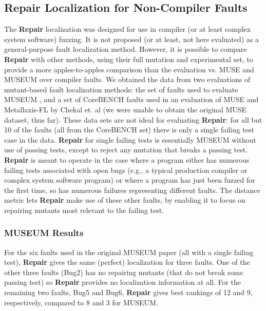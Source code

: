 \subsection{Repair Localization for Non-Compiler Faults}
\label{sec:otherfaults}

The {\bf Repair} localization was designed for use in compiler (or at least complex system software) fuzzing.  It is not proposed (or at least, not here evaluated) as a general-purpose fault localization method.  However, it is possible to compare {\bf Repair} with other methods, using their full mutation and experimental set, to provide a more apples-to-apples comparison than the evaluation vs. MUSE and MUSEUM over compiler faults.  We obtained the data from two evaluations of mutant-based fault localization methods:  the set of faults used to evaluate MUSEUM \cite{multilingual}, and a set of CoreBENCH \cite{CoreBENCH} faults used in an evaluation of MUSE and Metallaxis-FL by Chekal et. al \cite{Papadakis} (we were unable to obtain the original MUSE dataset, thus far).  These data sets are not ideal for evaluating {\bf Repair}: for all but 10 of the faults (all from the CoreBENCH set) there is only a single failing test case in the data.  {\bf Repair} for single failing tests is essentially MUSEUM without use of passing tests, except to reject any mutation that breaks a passing test.  {\bf Repair} is meant to operate in the case where a program either has numerous failing tests associated with open bugs (e.g., a typical production compiler or complex system software program) or where a program has just been fuzzed for the first time, so has numerous failures representing different faults.  The distance metric lets {\bf Repair} make use of these other faults, by enabling it to focus on repairing mutants most relevant to the failing test.

\subsubsection{MUSEUM Results}  For the six faults used in the original MUSEUM paper (all with a single failing test), {\bf Repair} gives the same (perfect) localization for three faults.  One of the other three faults (Bug2) has no repairing mutants (that do not break some passing test) so {\bf Repair} provides no localization information at all.  For the remaining two faults, Bug5 and Bug6, {\bf Repair} gives best rankings of 12 and 9, respectively, compared to 8 and 3 for MUSEUM.

